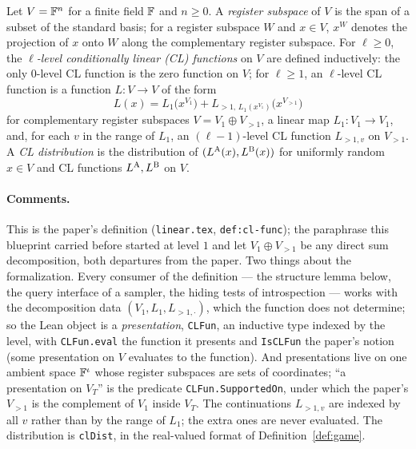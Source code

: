 \begin{definition}
\label{def:cl-function}
\leanok
Let $V = \mathbb{F}^n$ for a finite field $\mathbb{F}$ and $n \geq 0$. A \emph{register subspace} of $V$ is
the span of a subset of the standard basis; for a register subspace $W$ and $x \in V$, $x^W$
denotes the projection of $x$ onto $W$ along the complementary register subspace. For
$\ell \geq 0$, the \emph{$\ell$-level conditionally linear (CL) functions} on $V$ are defined
inductively: the only $0$-level CL function is the zero function on $V$; for $\ell \geq 1$, an
$\ell$-level CL function is a function $L : V \to V$ of the form
\begin{equation*}
  L(x) = L_1\bigl(x^{V_1}\bigr) + L_{>1,\, L_1(x^{V_1})}\bigl(x^{V_{>1}}\bigr)
\end{equation*}
for complementary register subspaces $V = V_1 \oplus V_{>1}$, a linear map $L_1 : V_1 \to
V_1$, and, for each $v$ in the range of $L_1$, an $(\ell-1)$-level CL function $L_{>1,v}$ on
$V_{>1}$. A \emph{CL distribution} is the distribution of $(L^{\textsc{A}}(x), L^{\textsc{B}}(x))$ for
uniformly random $x \in V$ and CL functions $L^{\textsc{A}}, L^{\textsc{B}}$ on $V$.
\end{definition}

\paragraph{Comments.} This is the paper's definition (\texttt{linear.tex},
\texttt{def:cl-func}); the paraphrase this blueprint carried before started at level $1$ and
let $V_1 \oplus V_{>1}$ be any direct sum decomposition, both departures from the paper. Two
things about the formalization. Every consumer of the definition --- the structure lemma
below, the query interface of a sampler, the hiding tests of introspection --- works with the
decomposition data $(V_1, L_1, L_{>1,\cdot})$, which the function does not determine; so the
Lean object is a \emph{presentation}, \texttt{CLFun}, an inductive type indexed by the level,
with \texttt{CLFun.eval} the function it presents and \texttt{IsCLFun} the paper's notion
(some presentation on $V$ evaluates to the function). And presentations live on one ambient
space $\mathbb{F}^\iota$ whose register subspaces are sets of coordinates; ``a presentation on $V_T$''
is the predicate \texttt{CLFun.SupportedOn}, under which the paper's $V_{>1}$ is the
complement of $V_1$ inside $V_T$. The continuations $L_{>1,v}$ are indexed by all $v$ rather
than by the range of $L_1$; the extra ones are never evaluated. The distribution is
\texttt{clDist}, in the real-valued format of Definition~\ref{def:game}.

